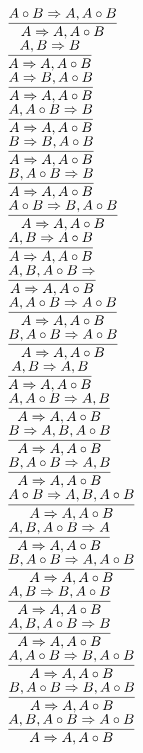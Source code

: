 \documentclass[11pt]{article}
\begin{document}
\begin{center}
\\$\infer{A\Rightarrow A, A\circ B}{A\circ B\Rightarrow A, A\circ B}$
\bigskip
\\$\infer{A\Rightarrow A, A\circ B}{A, B\Rightarrow B}$
\bigskip
\\$\infer{A\Rightarrow A, A\circ B}{A\Rightarrow B, A\circ B}$
\bigskip
\\$\infer{A\Rightarrow A, A\circ B}{A, A\circ B\Rightarrow B}$
\bigskip
\\$\infer{A\Rightarrow A, A\circ B}{B\Rightarrow B, A\circ B}$
\bigskip
\\$\infer{A\Rightarrow A, A\circ B}{B, A\circ B\Rightarrow B}$
\bigskip
\\$\infer{A\Rightarrow A, A\circ B}{A\circ B\Rightarrow B, A\circ B}$
\bigskip
\\$\infer{A\Rightarrow A, A\circ B}{A, B\Rightarrow A\circ B}$
\bigskip
\\$\infer{A\Rightarrow A, A\circ B}{A, B, A\circ B\Rightarrow }$
\bigskip
\\$\infer{A\Rightarrow A, A\circ B}{A, A\circ B\Rightarrow A\circ B}$
\bigskip
\\$\infer{A\Rightarrow A, A\circ B}{B, A\circ B\Rightarrow A\circ B}$
\bigskip
\\$\infer{A\Rightarrow A, A\circ B}{A, B\Rightarrow A, B}$
\bigskip
\\$\infer{A\Rightarrow A, A\circ B}{A, A\circ B\Rightarrow A, B}$
\bigskip
\\$\infer{A\Rightarrow A, A\circ B}{B\Rightarrow A, B, A\circ B}$
\bigskip
\\$\infer{A\Rightarrow A, A\circ B}{B, A\circ B\Rightarrow A, B}$
\bigskip
\\$\infer{A\Rightarrow A, A\circ B}{A\circ B\Rightarrow A, B, A\circ B}$
\bigskip
\\$\infer{A\Rightarrow A, A\circ B}{A, B, A\circ B\Rightarrow A}$
\bigskip
\\$\infer{A\Rightarrow A, A\circ B}{B, A\circ B\Rightarrow A, A\circ B}$
\bigskip
\\$\infer{A\Rightarrow A, A\circ B}{A, B\Rightarrow B, A\circ B}$
\bigskip
\\$\infer{A\Rightarrow A, A\circ B}{A, B, A\circ B\Rightarrow B}$
\bigskip
\\$\infer{A\Rightarrow A, A\circ B}{A, A\circ B\Rightarrow B, A\circ B}$
\bigskip
\\$\infer{A\Rightarrow A, A\circ B}{B, A\circ B\Rightarrow B, A\circ B}$
\bigskip
\\$\infer{A\Rightarrow A, A\circ B}{A, B, A\circ B\Rightarrow A\circ B}$

\end{center}
\end{document}
